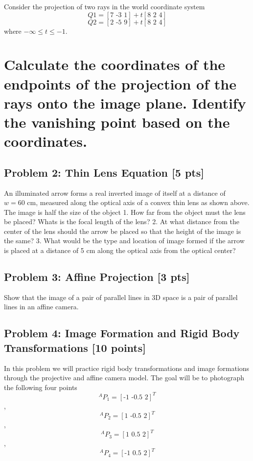 \documentclass[11pt]{article}
\begin{document}
Consider the projection of two rays in the world coordinate system \[
Q1 = [\text{7 -3 1}] + t[\text{8 2 4}]
\] \[
Q2 = [\text{2 -5 9}] + t[\text{8 2 4}]
\] where \(-\infty \leq t \leq -1\).

\section{Calculate the coordinates of the endpoints of the projection of
the rays onto the image plane. Identify the vanishing point based on the
coordinates.}\label{calculate-the-coordinates-of-the-endpoints-of-the-projection-of-the-rays-onto-the-image-plane.-identify-the-vanishing-point-based-on-the-coordinates.}

    \subsection{Problem 2: Thin Lens Equation {[}5
pts{]}}\label{problem-2-thin-lens-equation-5-pts}

An illuminated arrow forms a real inverted image of itself at a distance
of \(w = 60\text{ cm}\), measured along the optical axis of a convex
thin lens as shown above. The image is half the size of the object 1.
How far from the object must the lens be placed? Whats is the focal
length of the lens? 2. At what distance from the center of the lens
should the arrow be placed so that the height of the image is the same?
3. What would be the type and location of image formed if the arrow is
placed at a distance of 5 cm along the optical axis from the optical
center?

    \subsection{Problem 3: Affine Projection {[}3
pts{]}}\label{problem-3-affine-projection-3-pts}

Show that the image of a pair of parallel lines in 3D space is a pair of
parallel lines in an affine camera.

    \subsection{Problem 4: Image Formation and Rigid Body Transformations
{[}10
points{]}}\label{problem-4-image-formation-and-rigid-body-transformations-10-points}

In this problem we will practice rigid body transformations and image
formations through the projective and affine camera model. The goal will
be to photograph the following four points
\[^AP_1 = [\text{-1 -0.5 2}]^T\], \[^AP_2 = [\text{1 -0.5 2}]^T\],
\[^AP_3 = [\text{1 0.5 2}]^T\], \[^AP_4 = [\text{-1 0.5 2}]^T\]
\end{document}
